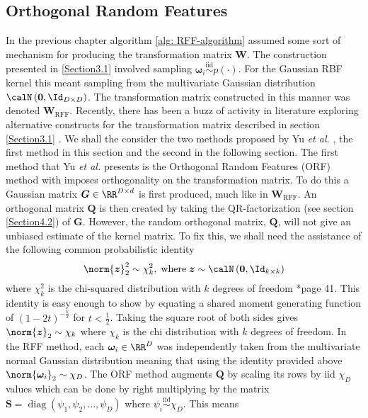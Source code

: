 \subsection{Orthogonal Random Features}\label{Section3.2}
In the previous chapter algorithm \ref{alg: RFF-algorithm} assumed some sort of mechanism for producing the transformation matrix $\bm{W}$. The construction presented in \ref{Section3.1} involved sampling $\bm{\omega}_{i} \stackrel{\text{iid}}{\sim} p(\cdot)$. For the Gaussian RBF kernel this meant sampling from the multivariate Gaussian distribution $\calN \left( \bm{0} , \Id_{D \times D} \right)$. The transformation matrix constructed in this manner was denoted $\bm{W}_{\text{RFF}}$. Recently, there has been a buzz of activity in literature exploring alternative constructs for the transformation matrix described in section \ref{Section3.1} \cite{LiuFanghui2021RFfK}. We shall the consider the two methods proposed by Yu {\it et al.} \cite{YuFelixX2016ORF}, the first method in this section and the second in the following section. The first method that Yu {\it et al.} presents is the Orthogonal Random Features (ORF) method with imposes orthogonality on the transformation matrix. To do this a Gaussian matrix $\bm{G} \in \RR^{D \times d}$ is first produced, much like in $\bm{W}_{\text{RFF}}$. An orthogonal matrix $\bm{Q}$ is then created by taking the QR-factorization (see section \ref{Section4.2}) of $\bm{G}$. However, the random orthogonal matrix, $\bm{Q}$, will not give an unbiased estimate of the kernel matrix. To fix this, we shall need the assistance of the following common probabilistic identity
\[
    \norm{\bm{z}}^2_2 \sim \chi^2_k, \; \text{where} \; \bm{z} \sim \calN \left( \bm{0}, \Id_{k \times k} \right)
\]
where $\chi^2_k$ is the chi-squared distribution with $k$ degrees of freedom \cite{BrockwellPeterJ1991TSTa}*{page 41}. This identity is easy enough to show by equating a shared moment generating function of $(1-2t)^{-\frac{k}{2}}$ for $t < \frac{1}{2}$. Taking the square root of both sides gives $\norm{\bm{z}}_2 \sim \chi_k$ where $\chi_k$ is the chi distribution with $k$ degrees of freedom. In the RFF method, each $\bm{\omega}_i \in \RR^D$ was independently taken from the multivariate normal Gaussian distribution meaning that using the identity provided above $\norm{\bm{\omega}_i}_2 \sim \chi_D$. The ORF method augments $\bm{Q}$ by scaling its rows by iid $\chi_D$ values which can be done by right multiplying by the matrix $\bm{S} = \operatorname{diag} \left( \psi_1 , \psi_2 , \ldots , \psi_D \right)$ where $\psi_i \stackrel{\text{iid}}{\sim} \chi_D$. This means
